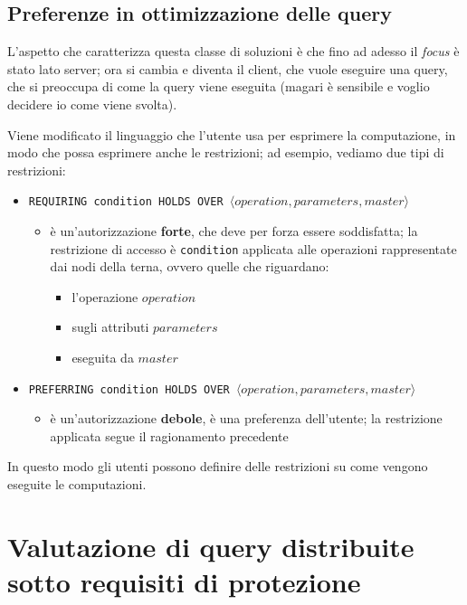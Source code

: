 \documentclass{report}
\begin{document}
\section{Preferenze in ottimizzazione delle query}

L'aspetto che caratterizza questa classe di soluzioni è che fino ad adesso il \textit{focus} è stato 
lato server; ora si cambia e diventa il client, che vuole eseguire una query, che si preoccupa di come la query viene eseguita 
(magari è sensibile e voglio decidere io come viene svolta).

\noindent Viene modificato il linguaggio che l'utente usa per esprimere la computazione, in modo che 
possa esprimere anche le restrizioni; ad esempio, vediamo due tipi di restrizioni:
\begin{itemize}
    \item \texttt{REQUIRING condition HOLDS OVER $\langle operation, parameters, master \rangle$}
    \begin{itemize}
        \item è un'autorizzazione \textbf{forte}, che deve per forza essere soddisfatta; la restrizione di accesso 
        è \texttt{condition} applicata alle operazioni rappresentate dai nodi della terna, ovvero quelle che 
        riguardano:
        \begin{itemize}
            \item l'operazione $operation$
            \item sugli attributi $parameters$
            \item eseguita da $master$
        \end{itemize}
    \end{itemize}
    \item \texttt{PREFERRING condition HOLDS OVER $\langle operation, parameters, master \rangle$}
    \begin{itemize}
        \item è un'autorizzazione \textbf{debole}, è una preferenza dell'utente; la restrizione applicata segue 
        il ragionamento precedente
    \end{itemize}
\end{itemize}

\noindent In questo modo gli utenti possono definire delle restrizioni su come vengono eseguite le computazioni.




\chapter{Valutazione di query distribuite sotto requisiti di protezione}
\end{document}
